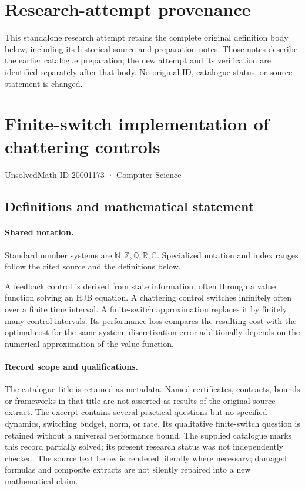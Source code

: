 \documentclass[11pt]{article}
\begin{document}
\section*{Research-attempt provenance}
This standalone research attempt retains the complete original definition body below,
including its historical source and preparation notes. Those notes describe the
earlier catalogue preparation; the new attempt and its verification are identified
separately after that body. No original ID, catalogue status, or source statement is changed.

\section{Finite-switch implementation of chattering controls}\label{20001173}
{\small UnsolvedMath ID 20001173 · Computer Science}
\subsection{Definitions and mathematical statement}

\paragraph{Shared notation.}Standard number systems are $\mathbb N,\mathbb Z,\mathbb Q,\mathbb R,\mathbb C$. Specialized notation and index ranges follow the cited source and the definitions below.


A feedback control is derived from state information, often through a value function solving an HJB equation. A chattering control switches infinitely often over a finite time interval. A finite-switch approximation replaces it by finitely many control intervals. Its performance loss compares the resulting cost with the optimal cost for the same system; discretization error additionally depends on the numerical approximation of the value function.
\paragraph{Record scope and qualifications.}
The catalogue title is retained as metadata. Named certificates, contracts, bounds or frameworks in that title are not asserted as results of the original source extract.
The excerpt contains several practical questions but no specified dynamics, switching budget, norm, or rate. Its qualitative finite-switch question is retained without a universal performance bound. The supplied catalogue marks this record partially solved; its present research status was not independently checked.
The source text below is rendered literally where necessary; damaged formulas and composite extracts are not silently repaired into a new mathematical claim.
\end{document}
